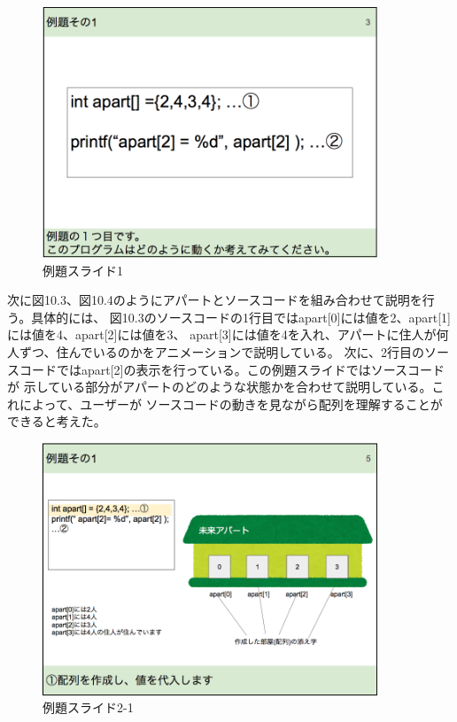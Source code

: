 \documentclass[openany,11pt,papersize]{jsbook}
\begin{document}
\begin{figure}[H]
\begin{center}
\includegraphics[width=10cm, bb=0 0 852 638]{img/9thParagraph/reidai_01.png}
\end{center}
\caption{例題スライド1}
\end{figure}

次に図10.3、図10.4のようにアパートとソースコードを組み合わせて説明を行う。具体的には、
図10.3のソースコードの1行目ではapart[0]には値を2、apart[1]には値を4、apart[2]には値を3、
apart[3]には値を4を入れ、アパートに住人が何人ずつ、住んでいるのかをアニメーションで説明している。
次に、2行目のソースコードではapart[2]の表示を行っている。この例題スライドではソースコードが
示している部分がアパートのどのような状態かを合わせて説明している。これによって、ユーザーが
ソースコードの動きを見ながら配列を理解することができると考えた。


\begin{figure}[H]
\begin{center}
\includegraphics[width=10cm, bb=0 0 850 640]{img/9thParagraph/reidai_02.png}
\end{center}
\caption{例題スライド2-1}
\end{figure}
\end{document}
